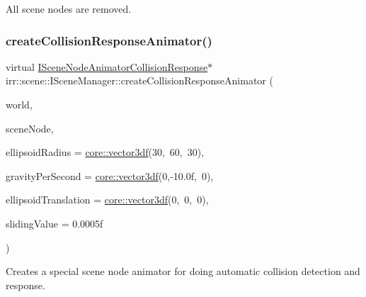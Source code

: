 All scene nodes are removed. \mbox{\label{classirr_1_1scene_1_1ISceneManager_a67b266cc40ebd66b5d21c26a78f002be}} 
\subsubsection{\texorpdfstring{create\+Collision\+Response\+Animator()}{createCollisionResponseAnimator()}}
{\footnotesize\ttfamily virtual \hyperlink{classirr_1_1scene_1_1ISceneNodeAnimatorCollisionResponse}{I\+Scene\+Node\+Animator\+Collision\+Response}$\ast$ irr\+::scene\+::\+I\+Scene\+Manager\+::create\+Collision\+Response\+Animator (\begin{DoxyParamCaption}\item[{\hyperlink{classirr_1_1scene_1_1ITriangleSelector}{I\+Triangle\+Selector} $\ast$}]{world,  }\item[{\hyperlink{classirr_1_1scene_1_1ISceneNode}{I\+Scene\+Node} $\ast$}]{scene\+Node,  }\item[{const \hyperlink{namespaceirr_1_1core_a06f169d08b5c429f5575acb7edbad811}{core\+::vector3df} \&}]{ellipsoid\+Radius = {\ttfamily \hyperlink{namespaceirr_1_1core_a06f169d08b5c429f5575acb7edbad811}{core\+::vector3df}(30,~60,~30)},  }\item[{const \hyperlink{namespaceirr_1_1core_a06f169d08b5c429f5575acb7edbad811}{core\+::vector3df} \&}]{gravity\+Per\+Second = {\ttfamily \hyperlink{namespaceirr_1_1core_a06f169d08b5c429f5575acb7edbad811}{core\+::vector3df}(0,-\/10.0f,~0)},  }\item[{const \hyperlink{namespaceirr_1_1core_a06f169d08b5c429f5575acb7edbad811}{core\+::vector3df} \&}]{ellipsoid\+Translation = {\ttfamily \hyperlink{namespaceirr_1_1core_a06f169d08b5c429f5575acb7edbad811}{core\+::vector3df}(0,~0,~0)},  }\item[{\hyperlink{namespaceirr_a0277be98d67dc26ff93b1a6a1d086b07}{f32}}]{sliding\+Value = {\ttfamily 0.0005f} }\end{DoxyParamCaption})\hspace{0.3cm}{\ttfamily [pure virtual]}}



Creates a special scene node animator for doing automatic collision detection and response. 

